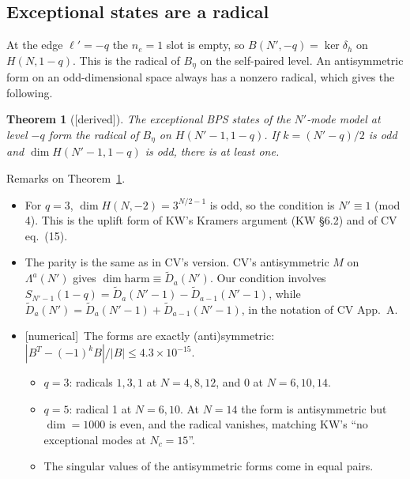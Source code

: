 \documentclass[11pt]{article}
\newcommand{\Np}{N'}
\newcommand{\lp}{\ell'}
\newcommand{\tagbox}[2]{\textsf{\small\color{#1}[#2]}}
\newcommand{\DER}{\tagbox{cder}{derived}}
\newcommand{\NUM}{\tagbox{cnum}{numerical}}
\theoremstyle{plain}
\newtheorem{theorem}{Theorem}
\theoremstyle{remark}
\numberwithin{equation}{section}
\begin{document}
\subsection{Exceptional states are a radical}
At the edge $\lp=-q$ the $n_e=1$ slot is empty, so $B(\Np,-q)=\ker\delta_h$ on $H(N,1-q)$. This is the radical of
$B_\eta$ on the self-paired level. An antisymmetric form on an odd-dimensional space always has a nonzero radical, which
gives the following.

\begin{theorem}[\DER]\label{thm:radical}
The exceptional BPS states of the $\Np$-mode model at level $-q$ form the radical of $B_\eta$ on $H(\Np-1,1-q)$. If
$k=(\Np-q)/2$ is odd and $\dim H(\Np-1,1-q)$ is odd, there is at least one.
\end{theorem}

\noindent Remarks on Theorem~\ref{thm:radical}.
\begin{itemize}\itemsep1pt
\item For $q=3$, $\dim H(N,-2)=3^{N/2-1}$ is odd, so the condition is $\Np\equiv1$ (mod 4). This is the uplift form of
KW's Kramers argument (KW \S6.2) and of CV eq.~(15).
\item The parity is the same as in CV's version. CV's antisymmetric $M$ on $\Lambda^a(\Np)$ gives
$\dim\mathrm{harm}\equiv\tilde D_a(\Np)$. Our condition involves
$S_{\Np-1}(1-q)=\tilde D_a(\Np-1)-\tilde D_{a-1}(\Np-1)$, while $\tilde D_a(\Np)=\tilde D_a(\Np-1)+\tilde D_{a-1}(\Np-1)$,
in the notation of CV App.~A.
\item \NUM\ The forms are exactly (anti)symmetric: $|B^T-(-1)^kB|/|B|\le4.3\times10^{-15}$.
\begin{itemize}\itemsep0pt
\item $q=3$: radicals $1,3,1$ at $N=4,8,12$, and 0 at $N=6,10,14$.
\item $q=5$: radical 1 at $N=6,10$. At $N=14$ the form is antisymmetric but $\dim=1000$ is even, and the radical
vanishes, matching KW's ``no exceptional modes at $N_c=15$''.
\item The singular values of the antisymmetric forms come in equal pairs.
\end{itemize}
\end{itemize}
\end{document}

